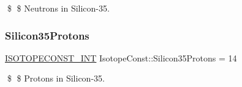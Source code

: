 \$ \$ Neutrons in Silicon-\/35. \mbox{\label{group___isotope_const-_silicon-_si35_ga5c9496cbaa50172bb1756ac811fe2fb2}} 
\subsubsection{\texorpdfstring{Silicon35\+Protons}{Silicon35Protons}}
{\footnotesize\ttfamily \mbox{\hyperlink{group___isotope_const-_macros_ga5f18360b3e99483a35c32d789e62621c}{I\+S\+O\+T\+O\+P\+E\+C\+O\+N\+S\+T\+\_\+\+I\+NT}} Isotope\+Const\+::\+Silicon35\+Protons = 14}

\$ \$ Protons in Silicon-\/35. 